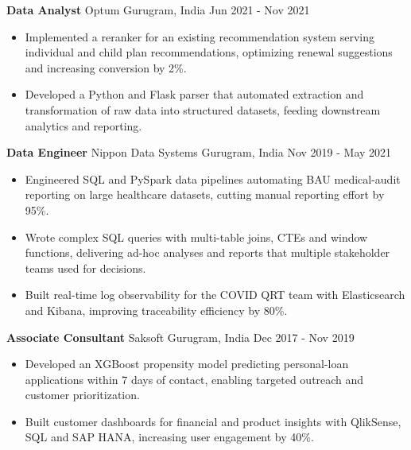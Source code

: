 \documentclass[10pt,a4paper]{article}
\newcommand{\role}[4]{\textbf{#1} \textbar{} #2 \hfill #3 \textbar{} #4\par}
\begin{document}
\vspace{3pt}
\role{Data Analyst}{Optum}{Gurugram, India}{Jun 2021 - Nov 2021}
\begin{itemize}
  \item Implemented a reranker for an existing recommendation system serving individual and child plan recommendations, optimizing renewal suggestions and increasing conversion by 2\%.
  \item Developed a Python and Flask parser that automated extraction and transformation of raw data into structured datasets, feeding downstream analytics and reporting.
\end{itemize}
\vspace{3pt}
\role{Data Engineer}{Nippon Data Systems}{Gurugram, India}{Nov 2019 - May 2021}
\begin{itemize}
  \item Engineered SQL and PySpark data pipelines automating BAU medical-audit reporting on large healthcare datasets, cutting manual reporting effort by 95\%.
  \item Wrote complex SQL queries with multi-table joins, CTEs and window functions, delivering ad-hoc analyses and reports that multiple stakeholder teams used for decisions.
  \item Built real-time log observability for the COVID QRT team with Elasticsearch and Kibana, improving traceability efficiency by 80\%.
\end{itemize}
\vspace{3pt}
\role{Associate Consultant}{Saksoft}{Gurugram, India}{Dec 2017 - Nov 2019}
\begin{itemize}
  \item Developed an XGBoost propensity model predicting personal-loan applications within 7 days of contact, enabling targeted outreach and customer prioritization.
  \item Built customer dashboards for financial and product insights with QlikSense, SQL and SAP HANA, increasing user engagement by 40\%.
\end{itemize}
\end{document}
